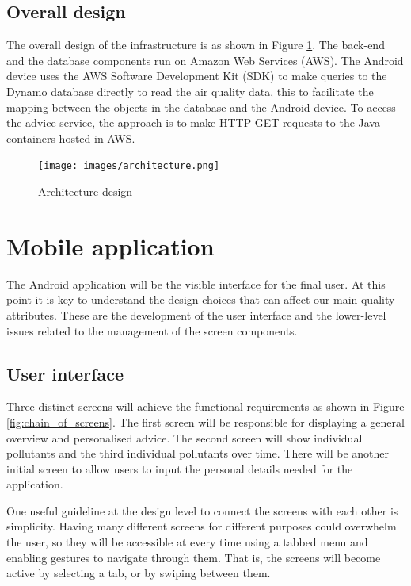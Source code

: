 \subsection{Overall design}
The overall design of the infrastructure is as shown in Figure \ref{fig:architecture}. The back-end and the database components run on Amazon Web Services (AWS). The Android device uses the AWS Software Development Kit (SDK) to make queries to the Dynamo database directly to read the air quality data, this to facilitate the mapping between the objects in the database and the Android device. To access the advice service, the approach is to make HTTP GET requests to the Java containers hosted in AWS. 
\begin{figure}[H]
\begin{adjustbox}{width=.65\textwidth,center=\textwidth}
  \centering
  \texttt{[image: images/architecture.png]}
\end{adjustbox}
  \caption[Architecture design]{Architecture design}
  \label{fig:architecture}
\end{figure}

\section{Mobile application}
The Android application will be the visible interface for the final user. At this point it is key to understand the design choices that can affect our main quality attributes. These are the development of the user interface and the lower-level issues related to the management of the screen components.

\subsection{User interface}
Three distinct screens will achieve the functional requirements as shown in Figure \ref{fig:chain_of_screens}. The first screen will be responsible for displaying a general overview and personalised advice. The second screen will show individual pollutants and the third individual pollutants over time. There will be another initial screen to allow users to input the personal details needed for the application.

One useful guideline at the design level to connect the screens with each other is simplicity. Having many different screens for different purposes could overwhelm the user, so they will be accessible at every time using a tabbed menu and enabling gestures to navigate through them. That is, the screens will become active by selecting a tab, or by swiping between them.

